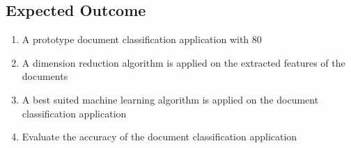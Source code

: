 \subsection{Expected Outcome}
\begin{enumerate}
	\item A prototype document classification application with 80%
	\item A dimension reduction algorithm is applied on the extracted features of the documents
	\item A best suited machine learning algorithm is applied on the document classification application
	\item Evaluate the accuracy of the document classification application
\end{enumerate}

